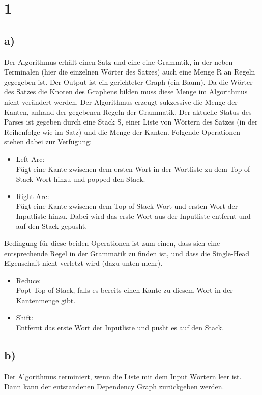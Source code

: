 \documentclass[a4paper,11pt,fleqn]{scrartcl}
\title{\titleinfo}
\author{\authorinfo}
\begin{document}
\maketitle
\notag

\section*{1}
\subsection*{a)}
Der Algorithmus erhält einen Satz und eine eine Grammtik, in der neben Terminalen (hier die einzelnen Wörter des Satzes) auch eine Menge R an Regeln gegegeben ist.
Der Output ist ein gerichteter Graph (ein Baum). 
Da die Wörter des Satzes die Knoten des Graphens bilden muss diese Menge im Algorithmus nicht verändert werden. 
Der Algorithmus erzeugt sukzessive die Menge der Kanten, anhand der gegebenen Regeln der Grammatik.
Der aktuelle Status des Parses ist gegeben durch eine Stack S, einer Liste von Wörtern des Satzes (in der Reihenfolge wie im Satz) und die Menge der Kanten.
Folgende Operationen stehen dabei zur Verfügung:
\begin{itemize}
 \item Left-Arc: \\ 
   Fügt eine Kante zwischen dem ersten Wort in der Wortliste zu dem Top of Stack Wort hinzu und popped den Stack.
 \item Right-Arc: \\
   Fügt eine Kante zwischen dem Top of Stack Wort und ersten Wort der Inputliste hinzu. 
   Dabei wird das erste Wort aus der Inputliste entfernt und auf den Stack gepusht.
\end{itemize}
Bedingung für diese beiden Operationen ist zum einen, dass sich eine entsprechende Regel in der Grammatik zu finden ist, und dass die Single-Head Eigenschaft nicht verletzt wird (dazu unten mehr).
\begin{itemize}
 \item Reduce: \\
   Popt Top of Stack, falls es bereits einen Kante zu diesem Wort in der Kantenmenge gibt.
 \item Shift: \\
   Entfernt das erste Wort der Inputliste und pusht es auf den Stack.
\end{itemize}
\subsection*{b)}
Der Algorithmus terminiert, wenn die Liste mit dem Input Wörtern leer ist. Dann kann der entstandenen Dependency Graph zurückgeben werden. 
\end{document}
